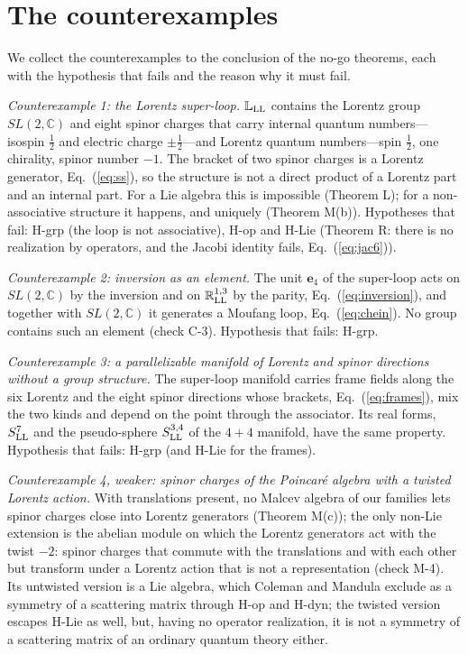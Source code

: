 \section{The counterexamples}
\label{sec:counterexamples}

We collect the counterexamples to the conclusion of the no-go theorems, each with the hypothesis that
fails and the reason why it must fail.

\emph{Counterexample 1: the Lorentz super-loop.} $\mathbb L_{\rm LL}$ contains the Lorentz group
$SL(2,\mathbb C)$ and eight spinor charges that carry internal quantum numbers---isospin $\tfrac12$
and electric charge $\pm\tfrac12$---and Lorentz quantum numbers---spin $\tfrac12$, one chirality,
spinor number $-1$. The bracket of two spinor charges is a Lorentz generator, Eq.~(\ref{eq:ss}), so the
structure is not a direct product of a Lorentz part and an internal part. For a Lie algebra this is
impossible (Theorem L); for a non-associative structure it happens, and uniquely (Theorem M(b)).
Hypotheses that fail: H-grp (the loop is not associative), H-op and H-Lie (Theorem R: there is no
realization by operators, and the Jacobi identity fails, Eq.~(\ref{eq:jac6})).

\emph{Counterexample 2: inversion as an element.} The unit $\mathbf e_4$ of the super-loop acts on
$SL(2,\mathbb C)$ by the inversion and on $\mathbb R^{1,3}_{\rm LL}$ by the parity, Eq.~(\ref{eq:inversion}),
and together with $SL(2,\mathbb C)$ it generates a Moufang loop, Eq.~(\ref{eq:chein}). No group contains
such an element (check C-3). Hypothesis that fails: H-grp.

\emph{Counterexample 3: a parallelizable manifold of Lorentz and spinor directions without a group
structure.} The super-loop manifold carries frame fields along the six Lorentz and the eight spinor
directions whose brackets, Eq.~(\ref{eq:frames}), mix the two kinds and depend on the point through the
associator. Its real forms, $S^7_{\rm LL}$ and the pseudo-sphere $S^{3,4}_{\rm LL}$ of the $4+4$ manifold,
have the same property. Hypothesis that fails: H-grp (and H-Lie for the frames).

\emph{Counterexample 4, weaker: spinor charges of the Poincar\'e algebra with a twisted Lorentz action.}
With translations present, no Malcev algebra of our families lets spinor charges close into Lorentz
generators (Theorem M(c)); the only non-Lie extension is the abelian module on which the Lorentz
generators act with the twist $-2$: spinor charges that commute with the translations and with each
other but transform under a Lorentz action that is not a representation (check M-4). Its untwisted
version is a Lie algebra, which Coleman and Mandula exclude as a symmetry of a scattering matrix through
H-op and H-dyn; the twisted version escapes H-Lie as well, but, having no operator realization, it is
not a symmetry of a scattering matrix of an ordinary quantum theory either.

